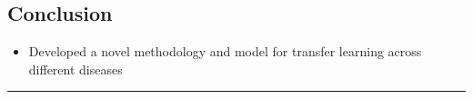 \documentclass[portrait,a0,final,20pt]{a0poster}
\begin{document}
{\begin{multicols}{2}
\section*{Conclusion}

\begin{itemize}
 \item Developed a novel methodology and model for transfer learning across different diseases
\end{itemize}





\end{multicols}
\hrule


}
\end{document}
